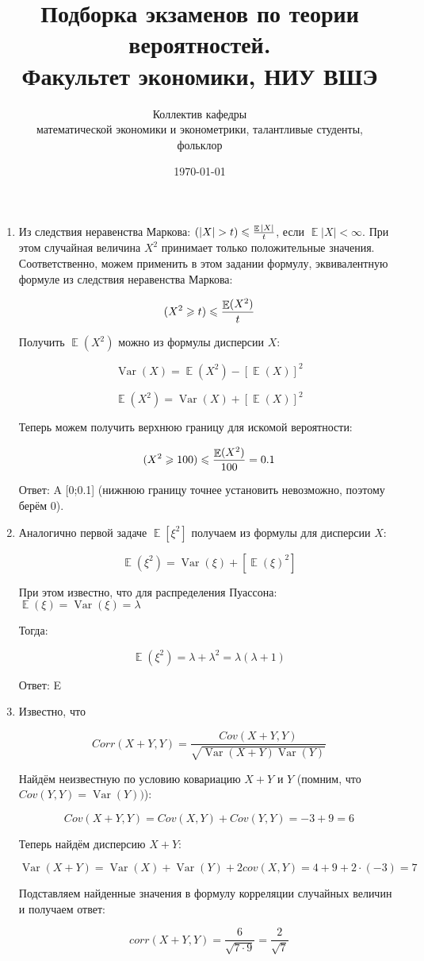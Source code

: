 \documentclass[11pt, a4paper]{article}
\title{Подборка экзаменов по теории вероятностей. \\Факультет экономики, НИУ ВШЭ}
\date{\today}
\author{Коллектив кафедры \\
математической экономики и эконометрики,
талантливые студенты,\\
 фольклор}
\DeclareMathOperator{\Var}{Var}
\DeclareMathOperator{\E}{\mathbb{E}}
\let\P\relax
\DeclareMathOperator{\P}{\mathbb{P}}
\renewcommand{\leq}{\leqslant}
\renewcommand{\geq}{\geqslant}
\theoremstyle{definition}
\begin{document}
\begin{enumerate}
	
	\item  
	Из следствия неравенства Маркова: $\P(|X|>t)\leq\frac{\E|X|}{t}$, если $\E|X|<\infty$. 
	При этом случайная величина $X^2$ принимает только положительные значения.
	Соответственно, можем применить в этом задании формулу, эквивалентную формуле из следствия неравенства Маркова:
	
	\[
	\P(X^2\geq t)\leq \frac{\E(X^2)}{t}
	\]
	
	Получить $\E(X^2)$ можно из формулы дисперсии $X$:
	
	\[
	\Var(X)=\E(X^2)-[\E(X)]^2
	\]
	
	\[
	\E(X^2)=\Var(X)+[\E(X)]^2
	\]
	
	Теперь можем получить верхнюю границу для искомой вероятности:
	
	\[
	\P(X^2\geq 100)\leq \frac{\E(X^2)}{100} = 0.1
	\]
	
	Ответ: A [0;0.1] (нижнюю границу точнее установить невозможно, поэтому берём 0).
	
	\item
	
	Аналогично первой задаче $\E[\xi^2]$ получаем из формулы для дисперсии $X$:
	
	\[
	\E(\xi^2)=\Var(\xi)+[\E(\xi)^2]
	\]
	
	При этом известно, что для распределения Пуассона: $\E(\xi)=\Var(\xi)=\lambda$
	
	Тогда:
	
	\[
	\E(\xi^2)=\lambda+\lambda^2=\lambda(\lambda+1)
	\]
	
	Ответ: E
	
	
	\item 
	
	Известно, что
	
	\[
	Corr(X+Y,Y)=\frac{Cov(X+Y,Y)}{\sqrt{\Var(X+Y)\Var(Y)}}
	\]
	
	Найдём неизвестную по условию ковариацию $X+Y$ и $Y$ (помним, что $Cov(Y,Y)=\Var(Y))$):
	
	\[
	Cov(X+Y,Y)=Cov(X,Y)+Cov(Y,Y)=-3+9=6
	\]
	
	Теперь найдём дисперсию $X+Y$:
	
	\[
	\Var(X+Y)=\Var(X)+\Var(Y)+2cov(X,Y)=4+9+2\cdot(-3)=7
	\]
	
	Подставляем найденные значения в формулу корреляции случайных величин и получаем ответ:
	
	\[
	corr(X+Y,Y)=\frac{6}{\sqrt{7\cdot9}}=\frac{2}{\sqrt{7}}
	\]
	

\end{enumerate}
\end{document}
